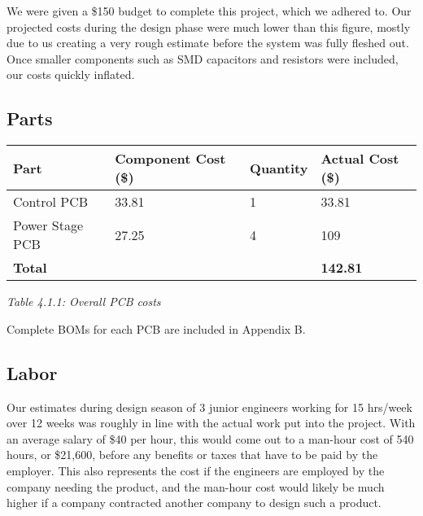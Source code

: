 We were given a \$150 budget to complete this project, which we adhered to.
Our projected costs during the design phase were much lower than this figure, mostly due to us creating a very rough estimate before the system was fully fleshed out.
Once smaller components such as SMD capacitors and resistors were included, our costs quickly inflated.

\subsection{Parts}
\begin{center}
    \begin{tabular}{|l|l|l|l|}
        \hline
        \bf Part        & \bf Component Cost (\$) & \bf Quantity & \bf Actual Cost (\$) \\
        \hline
        Control PCB     & 33.81                   & 1            & 33.81                \\
        \hline
        Power Stage PCB & 27.25                   & 4            & 109                  \\
        \hline
        \bf Total       &                         &              & \bf 142.81           \\
        \hline
    \end{tabular}

    \it Table 4.1.1: Overall PCB costs\\
\end{center}
Complete BOMs for each PCB are included in Appendix B.

\subsection{Labor}
Our estimates during design season of 3 junior engineers working for 15 hrs/week over 12 weeks was roughly in line with the actual work put into the project. 
With an average salary of \$40 per hour, this would come out to a man-hour cost of 540 hours, or \$21,600, before any benefits or taxes that have to be paid by the employer. 
This also represents the cost if the engineers are employed by the company needing the product, and the man-hour cost would likely be much higher if a company contracted another company to design such a product.
